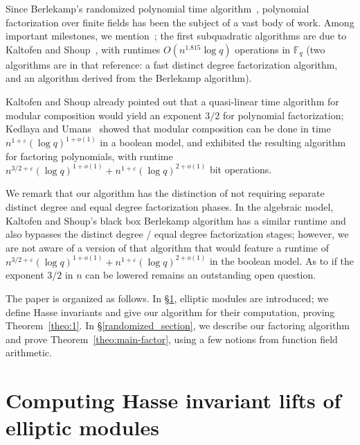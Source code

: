 \documentclass[12pt]{article}
\theoremstyle{plain}
\theoremstyle{definition}
\def\F{\ensuremath{\mathbb{F}}}
\begin{document}
Since Berlekamp's randomized polynomial time algorithm~\cite{ber},
polynomial factorization over finite fields has been the subject of a
vast body of work. Among important milestones, we
mention~\cite{cz,gs}; the first subquadratic algorithms are due to
Kaltofen and Shoup~\cite{ks}, with runtimes $O(n^{1.815}\log q)$
operations in $\F_q$  (two algorithms are in that reference:
a fast distinct degree factorization algorithm, and an algorithm
derived from the Berlekamp algorithm).

Kaltofen and Shoup already pointed out that a quasi-linear time
algorithm for modular composition would yield an exponent $3/2$ for
polynomial factorization; Kedlaya and Umans~\cite{ku} showed that
modular composition can be done in time $n^{1+\varepsilon} (\log
q)^{1+o(1)}$ in a boolean model, and exhibited the resulting
algorithm for factoring polynomials, with runtime $n^{3/2+\varepsilon}
(\log q)^{1 +o(1)} + n^{1+\varepsilon}(\log q)^{2+o(1)}$ bit
operations. 

We remark that our algorithm has the distinction of not requiring
separate distinct degree and equal degree factorization phases. In the
algebraic model, Kaltofen and Shoup's black box Berlekamp algorithm
has a similar runtime and also bypasses the distinct degree / equal
degree factorization stages; however, we are not aware of a version of
that algorithm that would feature a runtime of $n^{3/2+\varepsilon} (\log q)^{1 +o(1)} +
n^{1+\varepsilon}(\log q)^{2+o(1)}$ in the boolean model.
As to if the exponent $3/2$ in $n$ can be lowered remains an
outstanding open question.


The paper is organized as follows. In \S\ref{drinfeld_section},
elliptic modules are introduced; we define Hasse invariants and give
our algorithm for their computation, proving Theorem~\ref{theo:1}.  In
\S\ref{randomized_section}, we describe our factoring algorithm and
prove Theorem~\ref{theo:main-factor}, using a few notions from
function field arithmetic.

 

\section{Computing Hasse invariant lifts of elliptic modules}\label{drinfeld_section}

\end{document}
